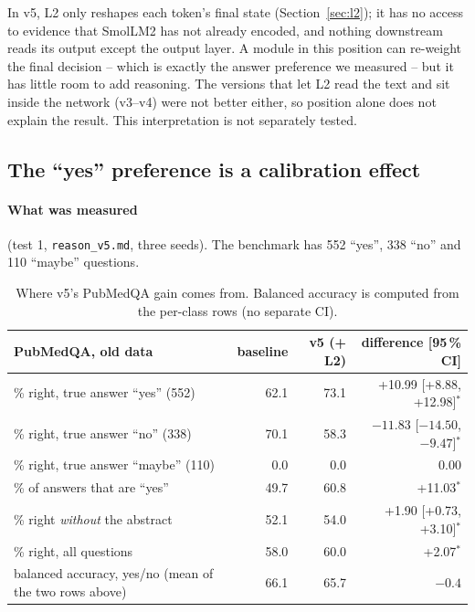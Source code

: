 \documentclass[a4paper,11pt,parskip=half]{scrartcl}
\newcommand{\sig}{\ensuremath{^{\ast}}}
\newcommand{\code}[1]{\texttt{\small #1}}
\begin{document}
In v5, L2 only reshapes each token's final state (Section~\ref{sec:l2}); it has no access to evidence that SmolLM2 has not already encoded, and nothing downstream reads its output except the output layer. A module in this position can re-weight the final decision -- which is exactly the answer preference we measured -- but it has little room to add reasoning. The versions that let L2 read the text and sit inside the network (v3--v4) were not better either, so position alone does not explain the result. This interpretation is not separately tested.

\subsection{The ``yes'' preference is a calibration effect}
\label{sec:calib}

\paragraph{What was measured} (test 1, \code{reason\_v5.md}, three seeds). The benchmark has 552 ``yes'', 338 ``no'' and 110 ``maybe'' questions.

\begin{table}[H]
\centering\small
\begin{tabularx}{\linewidth}{@{}>{\raggedright\arraybackslash}p{6.4cm}rrR@{}}
\toprule
PubMedQA, old data & baseline & v5 (+ L2) & difference [95\,\% CI]\\
\midrule
\% right, true answer ``yes'' (552) & 62.1 & 73.1 & +10.99 [+8.88, +12.98]\sig\\
\% right, true answer ``no'' (338) & 70.1 & 58.3 & $-11.83$ [$-14.50$, $-9.47$]\sig\\
\% right, true answer ``maybe'' (110) & 0.0 & 0.0 & 0.00\\
\% of answers that are ``yes'' & 49.7 & 60.8 & +11.03\sig\\
\% right \emph{without} the abstract & 52.1 & 54.0 & +1.90 [+0.73, +3.10]\sig\\
\midrule
\% right, all questions & 58.0 & 60.0 & +2.07\sig\\
balanced accuracy, yes/no (mean of the two rows above) & 66.1 & 65.7 & $-0.4$\\
\bottomrule
\end{tabularx}
\caption{Where v5's PubMedQA gain comes from. Balanced accuracy is computed from the per-class rows (no separate CI).}
\end{table}
\end{document}
